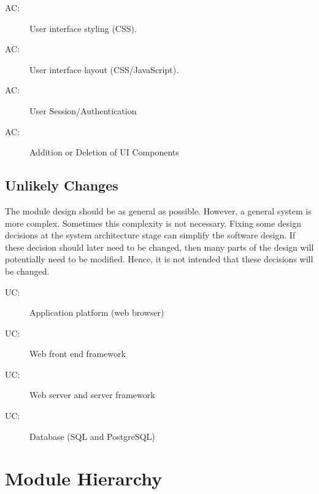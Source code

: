 \documentclass[12pt, titlepage]{article}
\newcounter{acnum}
\newcommand{\actheacnum}{AC\theacnum}
\newcounter{ucnum}
\newcommand{\uctheucnum}{UC\theucnum}
\begin{document}
\begin{description}
\item[ \actheacnum \label{acUILooks}:] User interface
  styling (CSS).

\item[ \actheacnum \label{acUILooks}:] User interface
  layout (CSS/JavaScript).

\item[ \actheacnum \label{acUILooks}:] User
    Session/Authentication

\item[ \actheacnum \label{acUILooks}:] Addition or
    Deletion of UI Components
\end{description}

\subsection{Unlikely Changes} \label{SecUchange}

The module design should be as general as possible. However, a general system is
more complex. Sometimes this complexity is not necessary. Fixing some design
decisions at the system architecture stage can simplify the software design. If
these decision should later need to be changed, then many parts of the design
will potentially need to be modified. Hence, it is not intended that these
decisions will be changed.

\begin{description}
    \item[ \uctheucnum \label{ucIO}:] Application
        platform (web browser)

    \item[ \uctheucnum \label{ucIO}:] Web front end
        framework

    \item[ \uctheucnum \label{ucIO}:] Web server and
        server framework

    \item[ \uctheucnum \label{ucIO}:] Database (SQL and
        PostgreSQL)
\end{description}

\section{Module Hierarchy} \label{SecMH}
\end{document}
